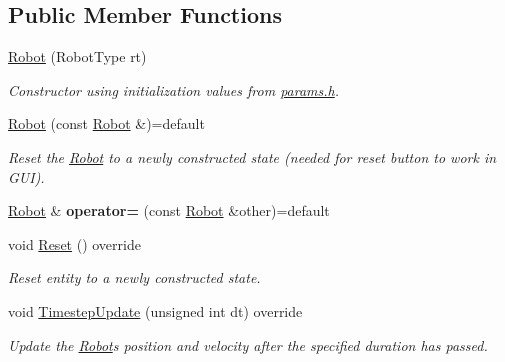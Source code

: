 \subsection*{Public Member Functions}
\begin{DoxyCompactItemize}
\item 
\mbox{\label{class_robot_a3475f306d3a9b7090e31a12399260055}} 
\mbox{\hyperlink{class_robot_a3475f306d3a9b7090e31a12399260055}{Robot}} (Robot\+Type rt)
\begin{DoxyCompactList}\small\item\em Constructor using initialization values from \mbox{\hyperlink{params_8h}{params.\+h}}. \end{DoxyCompactList}\item 
\mbox{\label{class_robot_a4fd835c7c44337d31d9fd09921d29908}} 
\mbox{\hyperlink{class_robot_a4fd835c7c44337d31d9fd09921d29908}{Robot}} (const \mbox{\hyperlink{class_robot}{Robot}} \&)=default
\begin{DoxyCompactList}\small\item\em Reset the \mbox{\hyperlink{class_robot}{Robot}} to a newly constructed state (needed for reset button to work in G\+UI). \end{DoxyCompactList}\item 
\mbox{\label{class_robot_a69f171c4965ac4523cd95e2191405d37}} 
\mbox{\hyperlink{class_robot}{Robot}} \& {\bfseries operator=} (const \mbox{\hyperlink{class_robot}{Robot}} \&other)=default
\item 
\mbox{\label{class_robot_af597fd14927d2cd5308ded62f4e54e29}} 
void \mbox{\hyperlink{class_robot_af597fd14927d2cd5308ded62f4e54e29}{Reset}} () override
\begin{DoxyCompactList}\small\item\em Reset entity to a newly constructed state. \end{DoxyCompactList}\item 
void \mbox{\hyperlink{class_robot_ae790462f8782efcfd26082eedec30ed5}{Timestep\+Update}} (unsigned int dt) override
\begin{DoxyCompactList}\small\item\em Update the \mbox{\hyperlink{class_robot}{Robot}}\textquotesingle{}s position and velocity after the specified duration has passed. \end{DoxyCompactList}\item 

\end{DoxyCompactItemize}
